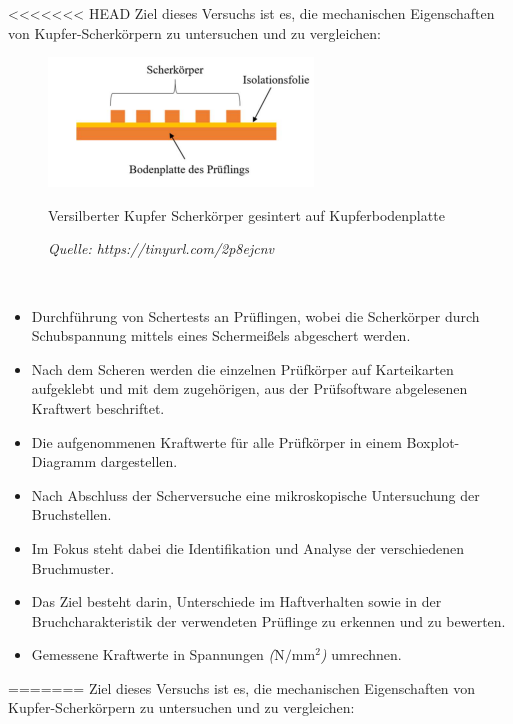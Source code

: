 <<<<<<< HEAD
Ziel dieses Versuchs ist es, die mechanischen Eigenschaften von Kupfer-Scherkörpern zu untersuchen und zu vergleichen:
\\
\vspace{0.05cm}
\begin{figure}[h]
    \centering
    \includegraphics[scale=0.95]{Bilder/schematik.png}
    \caption{Versilberter Kupfer Scherkörper gesintert auf Kupferbodenplatte}
    \caption*{\textit{Quelle: https://tinyurl.com/2p8ejcnv}}
    \vspace{0.2cm}
    \label{Abb.2: Versilberter Kupfer Scherkörper gesintert auf Kupferbodenplatte} 
\end{figure}\\

\begin{itemize}
\item Durchführung von Schertests an Prüflingen, wobei die Scherkörper durch Schubspannung mittels eines Schermeißels abgeschert werden.
\item Nach dem Scheren werden die einzelnen Prüfkörper auf Karteikarten aufgeklebt und mit dem zugehörigen, aus der Prüfsoftware abgelesenen Kraftwert beschriftet.
\item Die aufgenommenen Kraftwerte für alle Prüfkörper in einem Boxplot-Diagramm dargestellen.
\item Nach Abschluss der Scherversuche eine mikroskopische Untersuchung der Bruchstellen.
\item Im Fokus steht dabei die Identifikation und Analyse der verschiedenen Bruchmuster.
\item Das Ziel besteht darin, Unterschiede im Haftverhalten sowie in der Bruchcharakteristik der verwendeten Prüflinge zu erkennen und zu bewerten.
\item Gemessene Kraftwerte in Spannungen \textit{($\mathrm{N/mm^2}$)}  umrechnen.
\end{itemize}
=======
Ziel dieses Versuchs ist es, die mechanischen Eigenschaften von Kupfer-Scherkörpern zu untersuchen und zu vergleichen:\\
